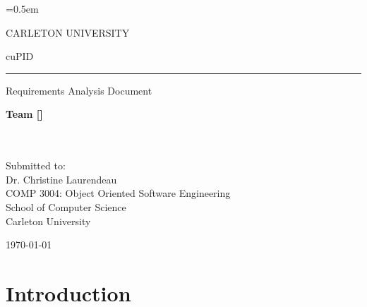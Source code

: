 \documentclass[12pt,letterpaper]{article}
\begin{document}
\everyrow{\hline}
\tabulinesep=0.5em


\thispagestyle{empty}

\begin{center}
	CARLETON UNIVERSITY
\end{center}

\vfill

\begin{center}
	{\fontsize{55pt}{55pt}\selectfont cuPID}
	\vspace{0.5em}\rule{\textwidth}{0.5pt}
	Requirements Analysis Document
\end{center}

\vspace{5em}

\begin{center}
	\textbf{Team [\teamname{}]}\\
	\personone{}\\
	\persontwo{}\\
	\personthree{}
\end{center}

\vfill

\begin{center}
	Submitted to:\\
	Dr. Christine Laurendeau\\
	COMP 3004: Object Oriented Software Engineering\\
	School of Computer Science\\
	Carleton University
\end{center}

\vspace{2em}

\begin{center}
	\today
\end{center}

\newpage{}

\tableofcontents{}

\renewcommand{\listfigurename}{Figures}
\listoffigures

\renewcommand{\listtablename}{Tables}
\listoftables

\newpage{}

\section{Introduction}
\end{document}
